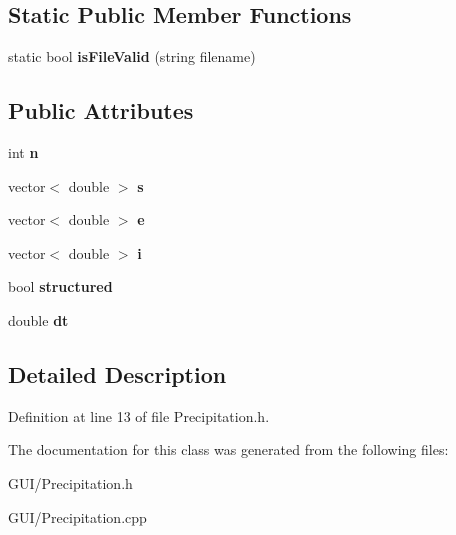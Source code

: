 \subsection*{Static Public Member Functions}
\begin{DoxyCompactItemize}
\item 
\mbox{\label{class_c_precipitation_ae13c9c8eeca936337f9fdc8b2a71863f}} 
static bool {\bfseries is\+File\+Valid} (string filename)
\end{DoxyCompactItemize}
\subsection*{Public Attributes}
\begin{DoxyCompactItemize}
\item 
\mbox{\label{class_c_precipitation_a81ce01fe02c864c64afb70ed9b5b564c}} 
int {\bfseries n}
\item 
\mbox{\label{class_c_precipitation_a38d7a8ed8968f1bcabd7dffebcf517b2}} 
vector$<$ double $>$ {\bfseries s}
\item 
\mbox{\label{class_c_precipitation_a1e75d3de0fc1b1297ecfc3e4c77811b6}} 
vector$<$ double $>$ {\bfseries e}
\item 
\mbox{\label{class_c_precipitation_a2f37ddbc717cf6d9591ee94216aa0821}} 
vector$<$ double $>$ {\bfseries i}
\item 
\mbox{\label{class_c_precipitation_a063d840d60a0b2b25504305cda23da1f}} 
bool {\bfseries structured}
\item 
\mbox{\label{class_c_precipitation_a67772aa1f852e103cbfcd94e1ca3f35d}} 
double {\bfseries dt}
\end{DoxyCompactItemize}


\subsection{Detailed Description}


Definition at line 13 of file Precipitation.\+h.



The documentation for this class was generated from the following files\+:\begin{DoxyCompactItemize}
\item 
G\+U\+I/Precipitation.\+h\item 
G\+U\+I/Precipitation.\+cpp\end{DoxyCompactItemize}
